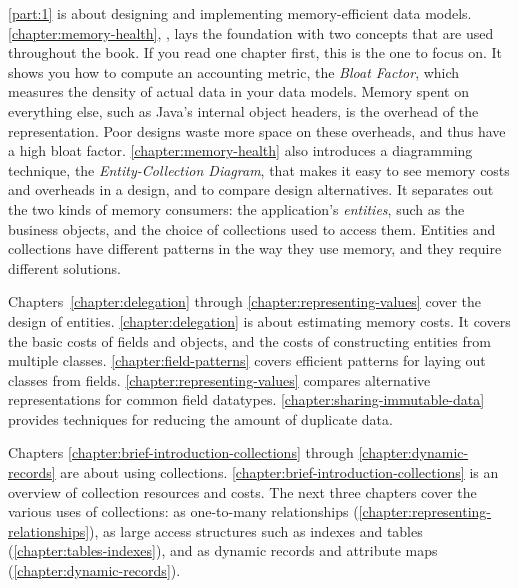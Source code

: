 

\autoref{part:1} is about designing and implementing memory-efficient data models.
\autoref{chapter:memory-health}, , lays the foundation with two
concepts that are used throughout the book. If you read one chapter first,
this is the one to focus on.
It shows you how to compute an accounting metric,
the \emph{Bloat Factor}, which measures the density of actual data in your
data models. Memory spent on everything else, such as
Java's internal object headers, is the overhead of the representation.
Poor designs waste more space on these overheads, and thus have a high bloat factor. \autoref{chapter:memory-health} also
introduces a diagramming technique,
the \emph{Entity-Collection Diagram}, that makes it easy to see memory costs and overheads in a design,
and to compare design alternatives.
It separates out the two kinds of memory consumers:
%
the application's \emph{entities}, such as the
business objects, and the choice of collections used to access them. Entities and collections have
different patterns in the way they use memory, and they require different solutions.

Chapters~\ref{chapter:delegation} through
\ref{chapter:representing-values} cover the design of
entities. \autoref{chapter:delegation} is about estimating memory costs. It covers the basic costs of fields
and objects, and the costs of constructing entities from multiple classes.
\autoref{chapter:field-patterns} covers efficient patterns for laying out classes from fields.
\autoref{chapter:representing-values} compares alternative representations for common field datatypes. 
\autoref{chapter:sharing-immutable-data} provides techniques for
reducing the amount of duplicate data.

Chapters \ref{chapter:brief-introduction-collections} through
\ref{chapter:dynamic-records} are about
using collections. \autoref{chapter:brief-introduction-collections} is
an overview of collection resources and costs.
The next three chapters cover the various uses of collections:
as one-to-many relationships (\autoref{chapter:representing-relationships}),
as large access structures such as indexes and tables
(\autoref{chapter:tables-indexes}), and as dynamic records and attribute maps
(\autoref{chapter:dynamic-records}).

